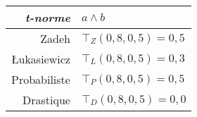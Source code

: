 \begin{tabular}{rl}
  \toprule
  \emph{t-norme} & \(a \wedge{} b\) \\
  \midrule
  Zadeh & \(⊤_Z(0,8, 0,5) = 0,5 \) \\
   Łukasiewicz & \(⊤_L(0,8, 0,5) = 0,3\) \\
  Probabiliste & \(⊤_P(0,8,0,5) = 0,5 \) \\
  Drastique & \(⊤_D(0,8, 0,5) = 0,0 \) \\
  \bottomrule
\end{tabular}